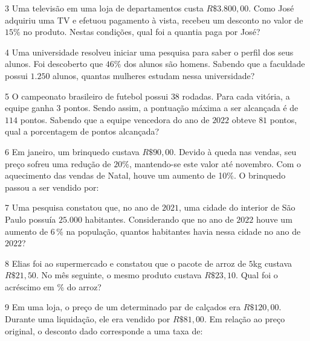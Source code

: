 
\num{3}  Uma televisão em uma loja de departamentos custa $R\$3.800,00$. Como José adquiriu uma TV e efetuou pagamento à vista, recebeu um
desconto no valor de $15\%$ no produto. Nestas condições, qual foi a
quantia paga por José?


\num{4}  Uma universidade resolveu iniciar uma pesquisa para saber o perfil
dos seus alunos. Foi descoberto que $46\%$ dos alunos são homens. Sabendo
que a faculdade possui $1.250$ alunos, quantas mulheres estudam nessa
universidade?


\num{5}  O campeonato brasileiro de futebol possui $38$ rodadas. Para cada
vitória, a equipe ganha $3$ pontos. Sendo assim, a pontuação máxima a ser
alcançada é de $114$ pontos. Sabendo que a equipe vencedora do ano de $2022$
obteve $81$ pontos, qual a porcentagem de pontos alcançada?


\num{6}  Em janeiro, um brinquedo custava $R\$90,00$. Devido à queda nas
vendas, seu preço sofreu uma redução de $20\%$, mantendo-se este valor até
novembro. Com o aquecimento das vendas de Natal, houve um aumento de
10\%. O brinquedo passou a ser vendido por:


\num{7}  Uma pesquisa constatou que, no ano de $2021$, uma cidade do interior de
São Paulo possuía $25.000$ habitantes. Considerando que no ano de $2022$
houve um aumento de $6\,\%$ na população, quantos habitantes havia nessa
cidade no ano de $2022$?


\num{8}  Elias foi ao supermercado e constatou que o pacote de arroz de $5$kg
custava $R\$21,50$. No mês seguinte, o mesmo produto custava $R\$23,10$.
Qual foi o acréscimo em \% do arroz?


\num{9}  Em uma loja, o preço de um determinado par de calçados era
$R\$120,00$. Durante uma liquidação, ele era vendido por $R\$81,00$. Em
relação ao preço original, o desconto dado corresponde a uma taxa de:

